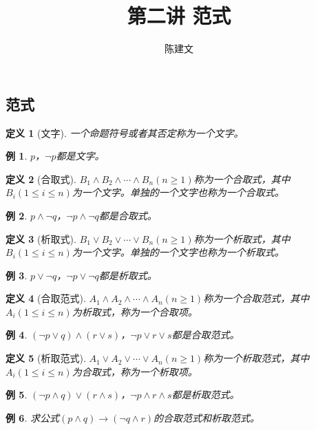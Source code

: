\documentclass{article}
\newtheorem{Def}{定义}
\newtheorem*{Example}{例}
\begin{document}
\begin{CJK*}{UTF8}{gbsn}
  \title{第二讲 范式}
  \author{陈建文}
  \maketitle

  \section{范式}
\begin{Def}[文字]
一个命题符号或者其否定称为一个文字。
\end{Def}
\begin{Example}
  $p$，$\lnot p$都是文字。
\end{Example}
\begin{Def}[合取式]
  $B_1\land B_2 \land \cdots \land B_n(n\geq 1)$称为一个合取式，其中$B_i (1\leq i \leq n)$为一个文字。单独的一个文字也称为一个合取式。
\end{Def}
\begin{Example}
  $p\land \lnot q$，$\lnot p\land \lnot q$都是合取式。
\end{Example}
\begin{Def}[析取式]
  $B_1\lor B_2 \lor \cdots \lor B_n(n\geq 1)$称为一个析取式，其中$B_i (1\leq i \leq n)$为一个文字。单独的一个文字也称为一个析取式。
\end{Def}
\begin{Example}
  $p\lor \lnot q$，$\lnot p\lor \lnot q$都是析取式。
\end{Example}
\begin{Def}[合取范式]
$A_1\land A_2\land \cdots \land A_n(n\geq 1)$称为一个合取范式，其中$A_i(1\leq i \leq n)$为析取式，称为一个合取项。
\end{Def}
\begin{Example}
  $(\lnot p\lor q)\land(r \lor s)$，$\lnot p\lor r \lor s$都是合取范式。
\end{Example}
\begin{Def}[析取范式]
  $A_1\lor A_2\lor \cdots \lor A_n(n\geq 1)$称为一个析取范式，其中$A_i(1\leq i \leq n)$为合取式，称为一个析取项。
  \end{Def}
  \begin{Example}
    $(\lnot p\land q)\lor(r \land s)$，$\lnot p\land r \land s$都是析取范式。
  \end{Example}
\begin{Example}
  求公式$(p\land q)\to (\lnot q \land r)$的合取范式和析取范式。
\end{Example}

\end{CJK*}
\end{document}
